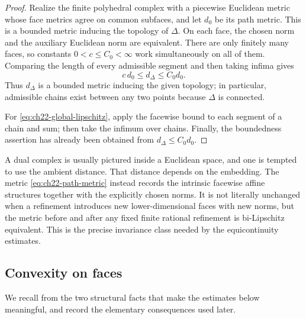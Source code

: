 \begin{proof}
Realize the finite polyhedral complex with a piecewise Euclidean metric
whose face metrics agree on common subfaces, and let $d_0$ be its path
metric.  This is a bounded metric inducing the topology of $\Delta$.  On
each face, the chosen norm and the auxiliary Euclidean norm are equivalent.
There are only finitely many faces, so constants $0<c\leq C_0<\infty$
work simultaneously on all of them.  Comparing the length of every
admissible segment and then taking infima gives
\[
                  c\,d_0\leq d_\Delta\leq C_0d_0.
\]
Thus $d_\Delta$ is a bounded metric inducing the given topology; in
particular, admissible chains exist between any two points because
$\Delta$ is connected.

For \eqref{eq:ch22-global-lipschitz}, apply the facewise bound to each
segment of a chain and sum; then take the infimum over chains.  Finally,
the boundedness assertion has already been obtained from
$d_\Delta\leq C_0d_0$.
\end{proof}

\begin{remark}
\label{rem:ch22-path-metric-choice}
A dual complex is usually pictured inside a Euclidean space, and one is
tempted to use the ambient distance.  That distance depends on the
embedding.  The metric \eqref{eq:ch22-path-metric} instead records the
intrinsic facewise affine structures together with the explicitly chosen
norms.  It is not literally unchanged when a refinement introduces new
lower-dimensional faces with new norms, but the metric before and after any
fixed finite rational refinement is bi-Lipschitz equivalent.  This is the
precise invariance class needed by the equicontinuity estimates.
\end{remark}

\subsection{Convexity on faces}

We recall from  the two structural facts that make the
estimates below meaningful, and record the elementary consequences used
later.

